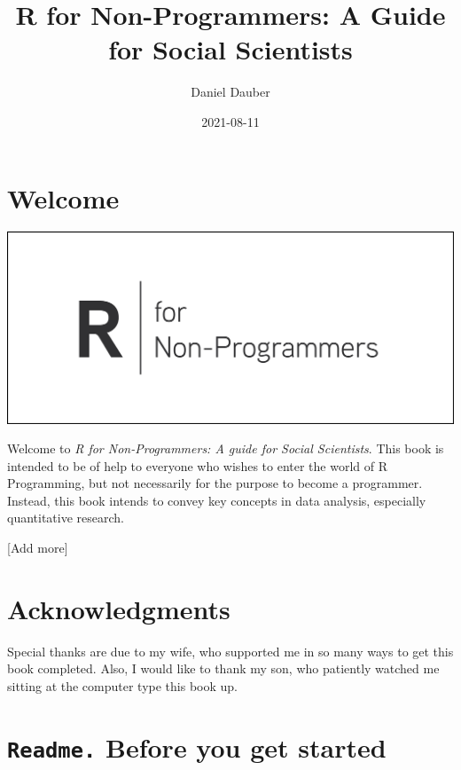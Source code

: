 \documentclass[
]{book}
\title{R for Non-Programmers: A Guide for Social Scientists}
\author{Daniel Dauber}
\date{2021-08-11}
\begin{document}
\maketitle

{
\setcounter{tocdepth}{1}
\tableofcontents
}
\hypertarget{welcome}{%
\chapter*{Welcome 👋}\label{welcome}}

\includegraphics{images/chapter_00_img/r_for_non_programmers_logo.png}

Welcome to \emph{R for Non-Programmers: A guide for Social Scientists}. This book is intended to be of help to everyone who wishes to enter the world of R Programming, but not necessarily for the purpose to become a programmer. Instead, this book intends to convey key concepts in data analysis, especially quantitative research.

{[}Add more{]}

\hypertarget{acknowledgments}{%
\chapter*{Acknowledgments 🙏}\label{acknowledgments}}

Special thanks are due to my wife, who supported me in so many ways to get this book completed. Also, I would like to thank my son, who patiently watched me sitting at the computer type this book up.

\hypertarget{readme-before-you-get-started}{%
\chapter{\texorpdfstring{\texttt{Readme.} Before you get started}{Readme. Before you get started}}\label{readme-before-you-get-started}}
\end{document}

